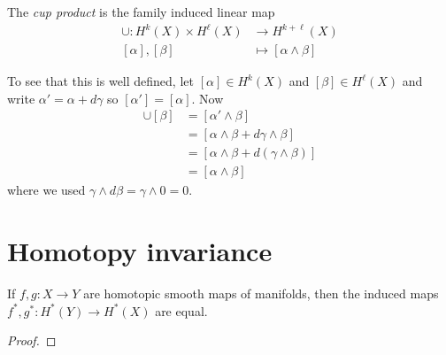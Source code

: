 \documentclass{article}
\begin{document}
\begin{definition}
\end{definition}

\begin{definition}
  The \emph{cup product} is the family induced linear map
  \begin{align*}
    \cup : H^k(X)\times H^\ell(X) &\to H^{k+\ell}(X) \\
    [\alpha],[\beta] &\mapsto [\alpha\wedge\beta]
  \end{align*}
\end{definition}

To see that this is well defined, let $[\alpha]\in H^k(X)$ and $[\beta]\in
H^\ell(X)$ and write $\alpha' = \alpha + d\gamma$ so $[\alpha']=[\alpha]$. Now
\begin{align*}
  [\alpha']\cup[\beta] &= [\alpha' \wedge \beta] \\
                       &= [\alpha\wedge\beta + d\gamma\wedge\beta ] \\
                       &= [\alpha\wedge\beta + d(\gamma\wedge\beta)] \\
                       &= [\alpha\wedge\beta]
\end{align*}
where we used $\gamma\wedge d\beta = \gamma\wedge 0 = 0$.

\section{Homotopy invariance}

\begin{lemma}
  If $f,g:X\to Y$ are homotopic smooth maps of manifolds, then
  the induced maps $f^*,g^*:H^*(Y)\to H^*(X)$ are equal.
  \begin{proof}
    \missingproof
  \end{proof}
\end{lemma}
\end{document}

